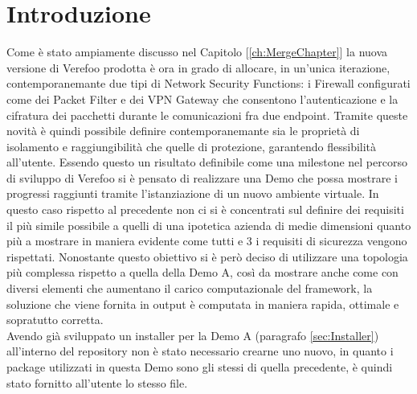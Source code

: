 \section{Introduzione}
Come è stato ampiamente discusso nel Capitolo [\ref{ch:MergeChapter}] la nuova versione di Verefoo prodotta è ora in grado di allocare, in un'unica iterazione, contemporanemante due tipi di Network Security Functions:
i Firewall configurati come dei Packet Filter e dei VPN Gateway che consentono l'autenticazione e la cifratura dei pacchetti durante le comunicazioni fra due endpoint. Tramite queste novità è quindi possibile definire contemporanemante
sia le proprietà di isolamento e raggiungibilità che quelle di protezione, garantendo flessibilità all'utente. Essendo questo un risultato definibile come una milestone nel percorso di sviluppo di Verefoo si è pensato di realizzare una Demo che
possa mostrare i progressi raggiunti tramite l'istanziazione di un nuovo ambiente virtuale. In questo caso rispetto al precedente non ci si è concentrati sul definire dei requisiti il più simile possibile a quelli di una ipotetica azienda di medie dimensioni
quanto più a mostrare in maniera evidente come tutti e 3 i requisiti di sicurezza vengono rispettati. Nonostante questo obiettivo si è però deciso di utilizzare una topologia più complessa rispetto a quella della Demo A, così da mostrare anche come con diversi elementi
che aumentano il carico computazionale del framework, la soluzione che viene fornita in output è computata in maniera rapida, ottimale e sopratutto corretta. \\
Avendo già sviluppato un installer per la Demo A (paragrafo \ref{sec:Installer}) all'interno del repository non è stato necessario crearne uno nuovo, in quanto i package utilizzati in questa Demo sono gli stessi di quella precedente, è quindi stato fornitto all'utente lo stesso 
file.

